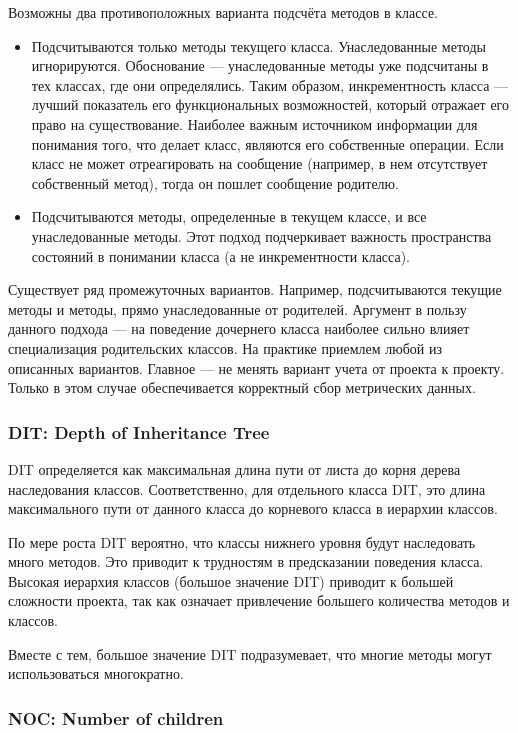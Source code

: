 \documentclass{../../text-style}
\begin{document}
Возможны два противоположных варианта подсчёта методов в классе.

\begin{itemize}
    \item Подсчитываются только методы текущего класса. Унаследованные методы игнорируются. Обоснование --- унаследованные методы уже подсчитаны в тех классах, где они определялись. Таким образом, инкрементность класса --- лучший показатель его функциональных возможностей, который отражает его право на существование. Наиболее важным источником информации для понимания того, что делает класс, являются его собственные операции. Если класс не может отреагировать на сообщение (например, в нем отсутствует собственный метод), тогда он пошлет сообщение родителю.
    \item Подсчитываются методы, определенные в текущем классе, и все унаследованные методы. Этот подход подчеркивает важность пространства состояний в понимании класса (а не инкрементности класса).
\end{itemize}

Существует ряд промежуточных вариантов. Например, подсчитываются текущие методы и методы, прямо унаследованные от родителей. Аргумент в пользу данного подхода --- на поведение дочернего класса наиболее сильно влияет специализация родительских классов.
На практике приемлем любой из описанных вариантов. Главное --- не менять вариант учета от проекта к проекту. Только в этом случае обеспечивается корректный сбор метрических данных.

\subsubsection{DIT: Depth of Inheritance Tree}

DIT определяется как максимальная длина пути от листа до корня дерева наследования классов. Соответственно, для отдельного класса DIT, это длина максимального пути от данного класса до корневого класса в иерархии классов.

По мере роста DIT вероятно, что классы нижнего уровня будут наследовать много методов. Это приводит к трудностям в предсказании поведения класса. Высокая иерархия классов (большое значение DIT) приводит к большей сложности проекта, так как означает привлечение большего количества методов и классов.

Вместе с тем, большое значение DIT подразумевает, что многие методы могут использоваться многократно.

\subsubsection{NOC: Number of children}
\end{document}
